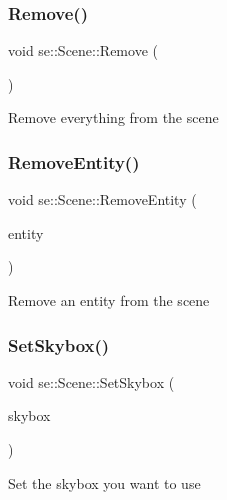 \mbox{\label{classse_1_1_scene_a73f7789f2585e65174380be509b88435}} 
\subsubsection{\texorpdfstring{Remove()}{Remove()}}
{\footnotesize\ttfamily void se\+::\+Scene\+::\+Remove (\begin{DoxyParamCaption}{ }\end{DoxyParamCaption})}

Remove everything from the scene \mbox{\label{classse_1_1_scene_a5803cfd0f0dccf350f7a3fe478b3c834}} 
\subsubsection{\texorpdfstring{Remove\+Entity()}{RemoveEntity()}}
{\footnotesize\ttfamily void se\+::\+Scene\+::\+Remove\+Entity (\begin{DoxyParamCaption}\item[{\mbox{\hyperlink{classse_1_1_entity}{Entity}} $\ast$}]{entity }\end{DoxyParamCaption})}

Remove an entity from the scene \mbox{\label{classse_1_1_scene_a3e6547c6013dc83a23d6cc0f349955f0}} 
\subsubsection{\texorpdfstring{Set\+Skybox()}{SetSkybox()}}
{\footnotesize\ttfamily void se\+::\+Scene\+::\+Set\+Skybox (\begin{DoxyParamCaption}\item[{\mbox{\hyperlink{classse_1_1_abstract_skybox}{Abstract\+Skybox}} $\ast$}]{skybox }\end{DoxyParamCaption})}

Set the skybox you want to use \mbox{\label{classse_1_1_scene_a75e3a3401c9d999f43baf01e89b16735}} 
